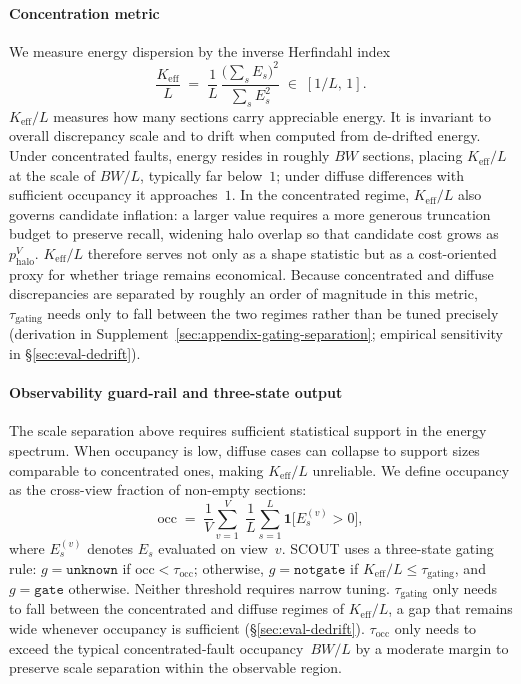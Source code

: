 \paragraph{Concentration metric}
We measure energy dispersion by the inverse Herfindahl index
\begin{equation*}
\frac{K_{\mathrm{eff}}}{L}
  \;=\; \frac{1}{L}\,\frac{\bigl(\sum_s E_s\bigr)^{2}}
        {\sum_s E_s^{2}}
  \;\in\; [1/L,\,1].
\end{equation*}
$K_{\mathrm{eff}}/L$ measures how many sections carry appreciable energy. It is invariant to overall discrepancy scale and to drift when computed from de-drifted energy. Under concentrated
faults, energy resides in roughly $BW$ sections, placing $K_{\mathrm{eff}}/L$ at the scale of $BW/L$, typically far below~$1$; under diffuse differences with sufficient occupancy it
approaches~$1$. In the concentrated regime, $K_{\mathrm{eff}}/L$ also governs candidate inflation: a larger value requires a more generous truncation budget to preserve recall, widening
halo overlap so that candidate cost grows as $p_{\mathrm{halo}}^V$. $K_{\mathrm{eff}}/L$ therefore serves not only as a shape statistic but as a cost-oriented proxy for whether triage
remains economical. Because concentrated and diffuse discrepancies are separated by roughly an order of magnitude in this metric, $\tau_{\text{gating}}$ needs only to fall between the two
regimes rather than be tuned precisely (derivation in Supplement~\ref{sec:appendix-gating-separation}; empirical sensitivity in \S\ref{sec:eval-dedrift}).

\paragraph{Observability guard-rail and three-state output}
The scale separation above requires sufficient statistical
support in the energy spectrum. When occupancy is low,
diffuse cases can collapse to support sizes comparable to
concentrated ones, making $K_{\mathrm{eff}}/L$ unreliable.
We define occupancy as the cross-view fraction of non-empty
sections:
\begin{equation}\label{eq:occupancy}
\mathrm{occ}
  \;=\; \frac{1}{V}\sum_{v=1}^{V}\;
        \frac{1}{L}\sum_{s=1}^{L}
        \mathbf{1}\!\bigl[E_s^{(v)} > 0\bigr],
\end{equation}
where $E_s^{(v)}$ denotes $E_s$ evaluated on view~$v$.
SCOUT uses a three-state gating rule:
$g=\texttt{unknown}$ if $\mathrm{occ}<\tau_{\mathrm{occ}}$;
otherwise, $g=\texttt{notgate}$ if $K_{\mathrm{eff}}/L\le\tau_{\mathrm{gating}}$,
and $g=\texttt{gate}$ otherwise.
Neither threshold requires narrow tuning.
$\tau_{\text{gating}}$ only needs to fall between the
concentrated and diffuse regimes of $K_{\mathrm{eff}}/L$,
a gap that remains wide whenever occupancy is sufficient
(\S\ref{sec:eval-dedrift}).
$\tau_{\text{occ}}$ only needs to exceed the typical
concentrated-fault occupancy~$BW/L$ by a moderate margin
to preserve scale separation within the observable region.
